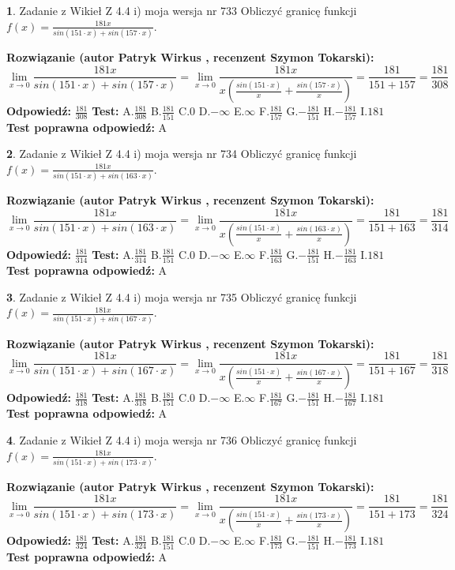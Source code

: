 \documentclass[12pt, a4paper]{article}
\theoremstyle{definition} %
\newtheorem{zad}{}
\newcommand{\zadStart}[1]{\begin{zad}#1\newline}
\newcommand{\zadStop}{\end{zad}}
\newcommand{\rozwStart}[2]{\noindent \textbf{Rozwiązanie (autor #1 , recenzent #2): }\newline}
\newcommand{\rozwStop}{\newline}
\newcommand{\odpStart}{\noindent \textbf{Odpowiedź:}\newline}
\newcommand{\odpStop}{\newline}
\newcommand{\testStart}{\noindent \textbf{Test:}\newline}
\newcommand{\testStop}{\newline}
\newcommand{\kluczStart}{\noindent \textbf{Test poprawna odpowiedź:}\newline}
\newcommand{\kluczStop}{\newline}
\begin{document}
\zadStart{Zadanie z Wikieł Z 4.4 i) moja wersja nr 733}
Obliczyć granicę funkcji $f(x)=\frac{181x}{sin(151\cdot x) +sin(157\cdot x)}$.
\zadStop
\rozwStart{Patryk Wirkus}{Szymon Tokarski}
$$\lim\limits_{x\to 0}\frac{181x}{sin(151\cdot x) +sin(157\cdot x)}=\lim\limits_{x\to 0}\frac{181x}{x(\frac{sin(151\cdot x)}{x}+\frac{sin(157\cdot x)}{x})}=\frac{181}{151+157} = \frac{181}{308}$$
\rozwStop
\odpStart
$\frac{181}{308}$
\odpStop
\testStart
A.$\frac{181}{308}$
B.$\frac{181}{151}$
C.$0$
D.$-\infty$
E.$\infty$
F.$\frac{181}{157}$
G.$-\frac{181}{151}$
H.$-\frac{181}{157}$
I.$181$
\testStop
\kluczStart
A
\kluczStop



\zadStart{Zadanie z Wikieł Z 4.4 i) moja wersja nr 734}
Obliczyć granicę funkcji $f(x)=\frac{181x}{sin(151\cdot x) +sin(163\cdot x)}$.
\zadStop
\rozwStart{Patryk Wirkus}{Szymon Tokarski}
$$\lim\limits_{x\to 0}\frac{181x}{sin(151\cdot x) +sin(163\cdot x)}=\lim\limits_{x\to 0}\frac{181x}{x(\frac{sin(151\cdot x)}{x}+\frac{sin(163\cdot x)}{x})}=\frac{181}{151+163} = \frac{181}{314}$$
\rozwStop
\odpStart
$\frac{181}{314}$
\odpStop
\testStart
A.$\frac{181}{314}$
B.$\frac{181}{151}$
C.$0$
D.$-\infty$
E.$\infty$
F.$\frac{181}{163}$
G.$-\frac{181}{151}$
H.$-\frac{181}{163}$
I.$181$
\testStop
\kluczStart
A
\kluczStop



\zadStart{Zadanie z Wikieł Z 4.4 i) moja wersja nr 735}
Obliczyć granicę funkcji $f(x)=\frac{181x}{sin(151\cdot x) +sin(167\cdot x)}$.
\zadStop
\rozwStart{Patryk Wirkus}{Szymon Tokarski}
$$\lim\limits_{x\to 0}\frac{181x}{sin(151\cdot x) +sin(167\cdot x)}=\lim\limits_{x\to 0}\frac{181x}{x(\frac{sin(151\cdot x)}{x}+\frac{sin(167\cdot x)}{x})}=\frac{181}{151+167} = \frac{181}{318}$$
\rozwStop
\odpStart
$\frac{181}{318}$
\odpStop
\testStart
A.$\frac{181}{318}$
B.$\frac{181}{151}$
C.$0$
D.$-\infty$
E.$\infty$
F.$\frac{181}{167}$
G.$-\frac{181}{151}$
H.$-\frac{181}{167}$
I.$181$
\testStop
\kluczStart
A
\kluczStop



\zadStart{Zadanie z Wikieł Z 4.4 i) moja wersja nr 736}
Obliczyć granicę funkcji $f(x)=\frac{181x}{sin(151\cdot x) +sin(173\cdot x)}$.
\zadStop
\rozwStart{Patryk Wirkus}{Szymon Tokarski}
$$\lim\limits_{x\to 0}\frac{181x}{sin(151\cdot x) +sin(173\cdot x)}=\lim\limits_{x\to 0}\frac{181x}{x(\frac{sin(151\cdot x)}{x}+\frac{sin(173\cdot x)}{x})}=\frac{181}{151+173} = \frac{181}{324}$$
\rozwStop
\odpStart
$\frac{181}{324}$
\odpStop
\testStart
A.$\frac{181}{324}$
B.$\frac{181}{151}$
C.$0$
D.$-\infty$
E.$\infty$
F.$\frac{181}{173}$
G.$-\frac{181}{151}$
H.$-\frac{181}{173}$
I.$181$
\testStop
\kluczStart
A
\kluczStop
\end{document}
